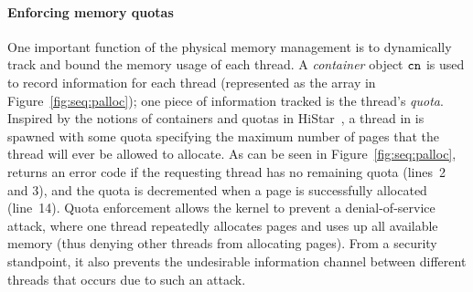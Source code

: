\paragraph{Enforcing memory quotas}
One important function of the physical memory management is to dynamically
track and bound the memory usage of each thread. A \emph{container}
object ${\texttt{cn}}$ is used to record information for each thread (represented as the array 
in Figure~\ref{fig:seq:palloc}); one piece of information tracked is the
thread's \emph{quota}. Inspired by the notions of containers and
quotas in HiStar~\cite{zeldovich06}, a thread
in {\mCTOS} is spawned with some quota specifying the maximum number
of pages that the thread will ever be allowed to allocate. As can be
seen in Figure~\ref{fig:seq:palloc},  returns an error
code if the requesting thread has no remaining quota (lines~2 and 3), 
and the quota is decremented when a page is successfully allocated (line~14).
Quota enforcement allows the kernel to prevent a denial-of-service attack,
where one thread repeatedly allocates pages and uses up all available
memory (thus denying other threads from allocating pages). From a security
standpoint, it also prevents the undesirable information channel between 
different threads that occurs due to such an attack.

